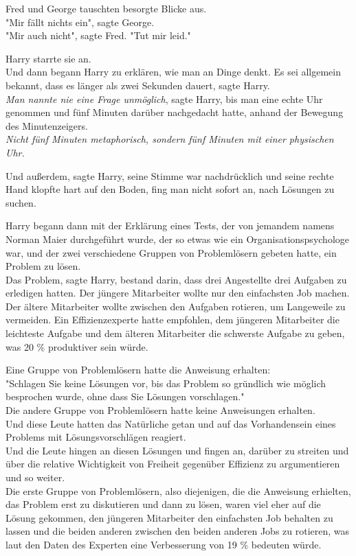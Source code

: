 {Fred und George tauschten besorgte Blicke aus.\\ "Mir fällt nichts ein", sagte George.\\ "Mir auch nicht", sagte Fred. "Tut mir leid."

Harry starrte sie an.\\ Und dann begann Harry zu erklären, wie man an Dinge denkt. Es sei allgemein bekannt, dass es länger als zwei Sekunden dauert, sagte Harry.\\ \emph{Man nannte nie eine Frage unmöglich}, sagte Harry, bis man eine echte Uhr genommen und fünf Minuten darüber nachgedacht hatte, anhand der Bewegung des Minutenzeigers.\\ \emph{Nicht fünf Minuten metaphorisch, sondern fünf Minuten mit einer physischen Uhr.}

Und außerdem, sagte Harry, seine Stimme war nachdrücklich und seine rechte Hand klopfte hart auf den Boden, fing man nicht sofort an, nach Lösungen zu suchen.

Harry begann dann mit der Erklärung eines Tests, der von jemandem namens Norman Maier durchgeführt wurde, der so etwas wie ein Organisationspsychologe war, und der zwei verschiedene Gruppen von Problemlösern gebeten hatte, ein Problem zu lösen.\\ Das Problem, sagte Harry, bestand darin, dass drei Angestellte drei Aufgaben zu erledigen hatten. Der jüngere Mitarbeiter wollte nur den einfachsten Job machen.\\ Der ältere Mitarbeiter wollte zwischen den Aufgaben rotieren, um Langeweile zu vermeiden. Ein Effizienzexperte hatte empfohlen, dem jüngeren Mitarbeiter die leichteste Aufgabe und dem älteren Mitarbeiter die schwerste Aufgabe zu geben, was 20 \% produktiver sein würde.

Eine Gruppe von Problemlösern hatte die Anweisung erhalten:\\ "Schlagen Sie keine Lösungen vor, bis das Problem so gründlich wie möglich besprochen wurde, ohne dass Sie Lösungen vorschlagen."\\ Die andere Gruppe von Problemlösern hatte keine Anweisungen erhalten.\\ Und diese Leute hatten das Natürliche getan und auf das Vorhandensein eines Problems mit Lösungsvorschlägen reagiert.\\ Und die Leute hingen an diesen Lösungen und fingen an, darüber zu streiten und über die relative Wichtigkeit von Freiheit gegenüber Effizienz zu argumentieren und so weiter.\\ Die erste Gruppe von Problemlösern, also diejenigen, die die Anweisung erhielten, das Problem erst zu diskutieren und dann zu lösen, waren viel eher auf die Lösung gekommen, den jüngeren Mitarbeiter den einfachsten Job behalten zu lassen und die beiden anderen zwischen den beiden anderen Jobs zu rotieren, was laut den Daten des Experten eine Verbesserung von 19 \% bedeuten würde.

}

